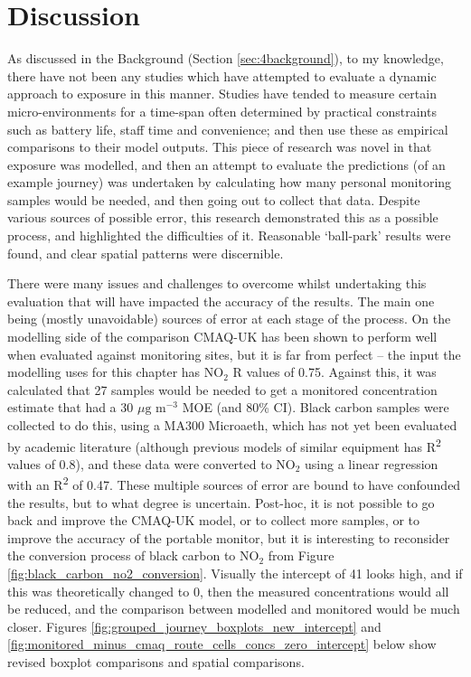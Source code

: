 \section{Discussion}
\label{sec:4Discussion}

As discussed in the Background (Section \ref{sec:4background}), to my knowledge, there have not been any studies which have attempted to evaluate a dynamic approach to exposure in this manner. Studies have tended to measure certain micro-environments for a time-span often determined by practical constraints such as battery life, staff time and convenience; and then use these as empirical comparisons to their model outputs.
This piece of research was novel in that exposure was modelled, and then an attempt to evaluate the predictions (of an example journey) was undertaken by calculating how many personal monitoring samples would be needed, and then going out to collect that data. Despite various sources of possible error, this research demonstrated this as a possible process, and highlighted the difficulties of it. Reasonable ‘ball-park’ results were found, and clear spatial patterns were discernible. 

There were many issues and challenges to overcome whilst undertaking this evaluation that will have impacted the accuracy of the results. The main one being (mostly unavoidable) sources of error at each stage of the process. On the modelling side of the comparison CMAQ-UK has been shown to perform well when evaluated against monitoring sites, but it is far from perfect – the input the modelling uses for this chapter has NO$_{2}$ R values of 0.75. Against this, it was calculated that 27 samples would be needed to get a monitored concentration estimate that had a 30 $\mu \text{g m}^{-3}$ MOE (and 80\% CI). Black carbon samples were collected to do this, using a MA300 Microaeth, which has not yet been evaluated by academic literature (although previous models of similar equipment has R\textsuperscript{2} values of 0.8), and these data were converted to NO$_{2}$ using a linear regression with an R\textsuperscript{2} of 0.47. These multiple sources of error are bound to have confounded the results, but to what degree is uncertain. Post-hoc, it is not possible to go back and improve the CMAQ-UK model, or to collect more samples, or to improve the accuracy of the portable monitor, but it is interesting to reconsider the conversion process of black carbon to NO$_{2}$ from Figure \ref{fig:black_carbon_no2_conversion}. Visually the intercept of 41 looks high, and if this was theoretically changed to 0, then the measured concentrations would all be reduced, and the comparison between modelled and monitored would be much closer. Figures \ref{fig:grouped_journey_boxplots_new_intercept} and \ref{fig:monitored_minus_cmaq_route_cells_concs_zero_intercept} below show revised boxplot comparisons and spatial comparisons.

